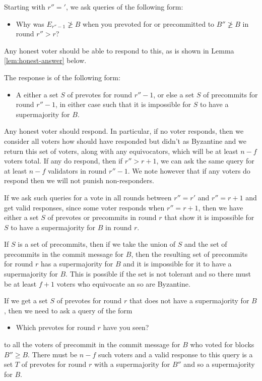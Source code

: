 \documentclass{article}
\begin{document}
Starting with $r''='$, we ask queries of the following form: 
\begin{itemize}
\item Why was $E_{r''-1} \not\geq B$  when you prevoted for or precommitted to $B'' \not\geq B$ in round $r'' > r$?
\end{itemize}
\noindent Any honest voter should be able to respond to this, as is shown in Lemma \ref{lem:honest-answer} below. 

The response is of the following form:
\begin{itemize}
\item A either a set $S$ of prevotes for round $r''-1$, or else a set $S$ of precommits for round $r''-1$, in either case such that it is impossible for $S$ to have a supermajority for $B$.
\end{itemize}

Any honest voter should respond.  In particular, if no voter responds, then we consider all  voters how should have responded but didn't as Byzantine and we return this set of voters, along with any equivocators, which will be at least $n-f$ voters total. If any do respond, then if $r'' > r+1$, we can ask the same query for at least $n-f$ validators in round $r''-1$. We note however that if any voters do respond then we will not punish non-responders.

If we ask such queries for a vote in all rounds between $r''=r'$ and $r''=r+1$ and get valid responses, since some voter responds when $r''=r+1$, then we have either a set $S$ of prevotes or precommits in round $r$ that show it is impossible for $S$ to have a supermajority for $B$ in round $r$.

If $S$ is a set of precommits, then if we take the union of $S$ and the set of precommits in the commit message for $B$, then the resulting set of precommits for round $r$ has a supermajority for $B$ and it is impossible for it to have a supermajority for $B$. This is possible if the set is not tolerant and so there must be at least $f+1$ voters who equivocate an so are Byzantine.

If we get a set $S$ of prevotes for round $r$ that does not have a supermajority for $B$, then we need to ask a query of the form

\begin{itemize}
\item Which prevotes for round $r$ have you seen?
\end{itemize}
\noindent to all the voters of precommit in the commit message for $B$  who voted for blocks $B'' \geq B$. There must be $n-f$ such voters and a valid response to this query is a set $T$ of prevotes for round $r$ with a supermajority for $B''$ and so a supermajority for $B$.
\end{document}
